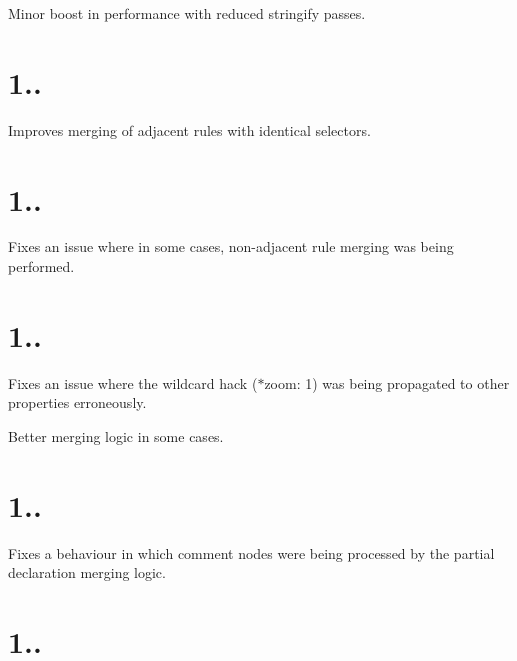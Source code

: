 \begin{DoxyItemize}
\item Minor boost in performance with reduced stringify passes.
\end{DoxyItemize}

\section*{1..}


\begin{DoxyItemize}
\item Improves merging of adjacent rules with identical selectors.
\end{DoxyItemize}

\section*{1..}


\begin{DoxyItemize}
\item Fixes an issue where in some cases, non-\/adjacent rule merging was being performed.
\end{DoxyItemize}

\section*{1..}


\begin{DoxyItemize}
\item Fixes an issue where the wildcard hack ({\ttfamily $\ast$zoom\+: 1}) was being propagated to other properties erroneously.
\item Better merging logic in some cases.
\end{DoxyItemize}

\section*{1..}


\begin{DoxyItemize}
\item Fixes a behaviour in which comment nodes were being processed by the partial declaration merging logic.
\end{DoxyItemize}

\section*{1..}


